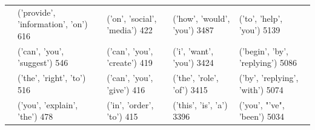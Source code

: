 \begin{table}[t]
\begin{tabular}{|l|l|l|l|l|}
                                  & ('provide', 'information', 'on') 616  & ('on', 'social', 'media') 422     & ('how', 'would', 'you') 3487    & ('to', 'help', 'you') 5139       \\
                                  & ('can', 'you', 'suggest') 546         & ('can', 'you', 'create') 419      & ('i', 'want', 'you') 3424       & ('begin', 'by', 'replying') 5086 \\
                                  & ('the', 'right', 'to') 516            & ('can', 'you', 'give') 416        & ('the', 'role', 'of') 3415      & ('by', 'replying', 'with') 5074  \\
                                  & ('you', 'explain', 'the') 478         & ('in', 'order', 'to') 415         & ('this', 'is', 'a') 3396        & ('you', "'ve", 'been') 5034      \\
\bottomrule
\end{tabular}
\end{table}

